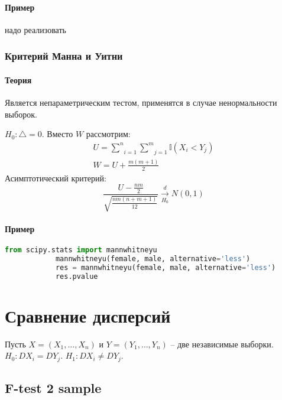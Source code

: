 		\paragraph*{Пример}\label{cha:2sample/sec:mo/subsec:pair/subsubsec:wilcox/par:prob}

		надо реализовать

	\subsubsection{Критерий Манна и Уитни}\label{cha:2sample/sec:mo/subsec:pair/subsubsec:mann}

		\paragraph*{Теория}\label{cha:2sample/sec:mo/subsec:pair/subsubsec:mann/par:theory}

		Является непараметрическим тестом, применятся в случае ненормальности выборок.

		$H_0: \triangle = 0$. Вместо $W$ рассмотрим:
		$$\begin{gathered}
			U = \underset{i=1}{\overset{n}{\sum}}\underset{j=1}{\overset{m}{\sum}}\mathbb{I}(X_i < Y_j) \\
			W = U + \frac{m(m+1)}{2}
		\end{gathered}$$
		Асимптотический критерий:
		$$\frac{U - \frac{n m }{2}}{\sqrt{\frac{n m (n+m+1)}{12}}} \xrightarrow[H_0]{d} N(0,1)$$

		\paragraph*{Пример}\label{cha:2sample/sec:mo/subsec:pair/subsubsec:mann/par:prob}

		\begin{lstlisting}[language=Python]
			from scipy.stats import mannwhitneyu
			mannwhitneyu(female, male, alternative='less')
			res = mannwhitneyu(female, male, alternative='less')
			res.pvalue
		\end{lstlisting}

\section{Сравнение дисперсий}\label{cha:2sample/sec:var}

Пусть $X = (X_1, \dots, X_n)$ и $Y = (Y_1, \dots, Y_n)$ -- две независимые выборки. $H_0: D X_i = D Y_j$. $H_1: D X_i \not = D Y_j$. 

\subsection{F-test 2 sample}\label{cha:2sample/sec:var/subsec:ftest}

